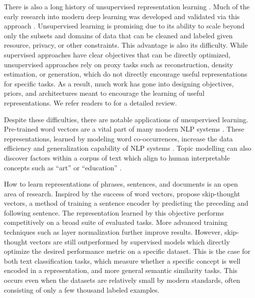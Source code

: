 \documentclass{article}
\begin{document}
There is also a long history of unsupervised representation learning \cite{olshausen1997sparse}. Much of the early research into modern deep learning was developed and validated via this approach \cite{hinton2006reducing} \cite{huang2007unsupervised} \cite{vincent2008extracting} \cite{coates2010analysis} \cite{le2013building}. Unsupervised learning is promising due to its ability to scale beyond only the subsets and domains of data that can be cleaned and labeled given resource, privacy, or other constraints. This advantage is also its difficulty. While supervised approaches have clear objectives that can be directly optimized, unsupervised approaches rely on proxy tasks such as reconstruction, density estimation, or generation, which do not directly encourage useful representations for specific tasks. As a result, much work has gone into designing objectives, priors, and architectures meant to encourage the learning of useful representations. We refer readers to \citet{goodfellow2016deep} for a detailed review.

Despite these difficulties, there are notable applications of unsupervised learning. Pre-trained word vectors are a vital part of many modern NLP systems \cite{collobert2011natural}. These representations, learned by modeling word co-occurrences, increase the data efficiency and generalization capability of NLP systems \cite{pennington2014glove} \cite{chen2014fast}. Topic modelling can also discover factors within a corpus of text which align to human interpretable concepts such as “art” or “education” \cite{blei2003latent}.

How to learn representations of phrases, sentences, and documents is an open area of research. Inspired by the success of word vectors, \citet{kiros2015skip} propose skip-thought vectors, a method of training a sentence encoder by predicting the preceding and following sentence. The representation learned by this objective performs competitively on a broad suite of evaluated tasks. More advanced training techniques such as layer normalization \cite{ba2016layer} further improve results. However, skip-thought vectors are still outperformed by supervised models which directly optimize the desired performance metric on a specific dataset. This is the case for both text classification tasks, which measure whether a specific concept is well encoded in a representation, and more general semantic similarity tasks. This occurs even when the datasets are relatively small by modern standards, often consisting of only a few thousand labeled examples. 
\end{document}
